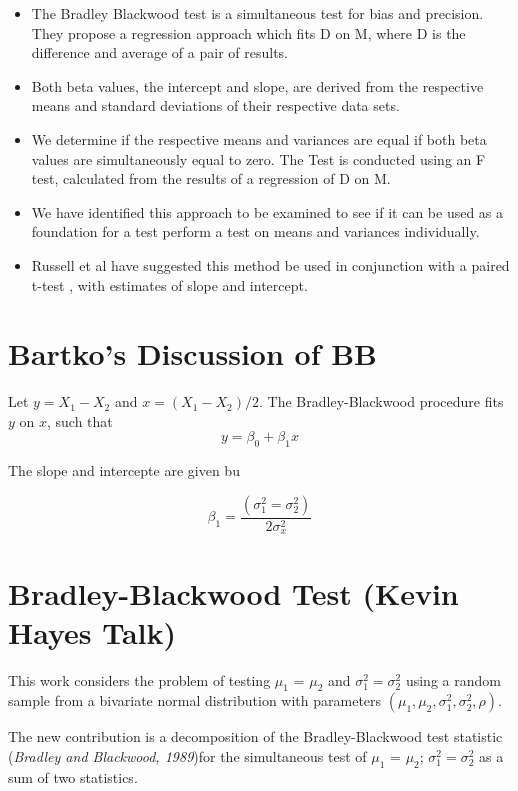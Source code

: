\documentclass[MAIN.tex]{subfiles}
\begin{document}
	\begin{itemize}
		\item The Bradley Blackwood test is a simultaneous test for bias and
		precision. They propose a regression approach which fits D on M,
		where D is the difference and average of a pair of results.
		\item Both beta values, the intercept and slope, are derived from the respective means and
		standard deviations of their respective data sets.
		\item We determine if the respective means and variances are equal if
		both beta values are simultaneously equal to zero. The Test is
		conducted using an F test, calculated from the results of a
		regression of D on M.
		\item We have identified this approach  to be examined to see if it can
		be used as a foundation for a test perform a test on means and
		variances individually.
		\item Russell et al have suggested this method be used in conjunction
		with a paired t-test , with estimates of slope and intercept.
	\end{itemize}
	
	
\section*{Bartko's Discussion of BB}

Let $y = X_1 - X_2$ and $x= (X_1 - X_2)/2$.
The Bradley-Blackwood procedure fits $y$ on $x$, such that
\[ y = \beta_0 + \beta_1x \]

The slope and intercepte are given bu

\[\beta_1 =  \frac{(\sigma^2_1 = \sigma^2_2)}{2\sigma^2_x}\]


	\section{Bradley-Blackwood Test (Kevin Hayes Talk)}
	
	This work considers the problem of testing $\mu_1$ = $\mu_2$ and $\sigma^2_1 = \sigma^2_2$ using a random sample from a bivariate normal distribution with parameters $(\mu_1, \mu_2, \sigma^2_1, \sigma^2_2, \rho)$. 
	
	The new contribution is a decomposition of the Bradley-Blackwood test statistic (\textit{Bradley and Blackwood, 1989})for the simultaneous test of {$\mu_1$ = $\mu_2$; $\sigma^2_1 = \sigma^2_2$}  as a sum of two statistics. 
	
\end{document}

